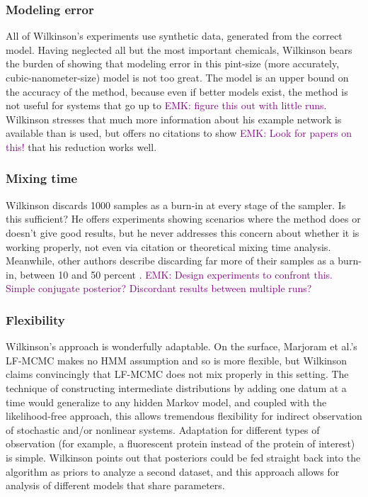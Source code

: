 \documentclass{article}
\newcommand\EMK[1]{\textcolor{purple}{EMK: #1}}
\begin{document}
\subsubsection{Modeling error}
All of Wilkinson's experiments use synthetic data, generated from the correct model. Having neglected all but the most important chemicals, Wilkinson bears the burden of showing that modeling error in this pint-size (more accurately, cubic-nanometer-size) model is not too great. The model is an upper bound on the accuracy of the method, because even if better models exist, the method is not useful for systems that go up to \EMK{figure this out with little runs}. Wilkinson stresses that much more information about his example network is available than is used, but offers no citations to show \EMK{Look for papers on this!} that his reduction works well.

\subsubsection{Mixing time}
Wilkinson discards 1000 samples as a burn-in at every stage of the sampler. Is this sufficient? He offers experiments showing scenarios where the method does or doesn't give good results, but he never addresses this concern about whether it is working properly, not even via citation or theoretical mixing time analysis. Meanwhile, other authors describe discarding far more of their samples as a burn-in, between 10 and 50 percent \cite{gupta2014comparison,zechner2014scalable}.  \EMK{Design experiments to confront this. Simple conjugate posterior? Discordant results between multiple runs?}


\subsubsection{Flexibility}
Wilkinson's approach is wonderfully adaptable. On the surface, Marjoram et al.'s LF-MCMC makes no HMM assumption and so is more flexible, but Wilkinson claims convincingly that LF-MCMC does not mix properly in this setting. The technique of constructing intermediate distributions by adding one datum at a time would generalize to any hidden Markov model, and coupled with the likelihood-free approach, this allows tremendous flexibility for indirect observation of stochastic and/or nonlinear systems. Adaptation for different types of observation (for example, a fluorescent protein instead of the protein of interest) is simple. Wilkinson points out that posteriors could be fed straight back into the algorithm as priors to analyze a second dataset, and this approach allows for analysis of different models that share parameters.
\end{document}
